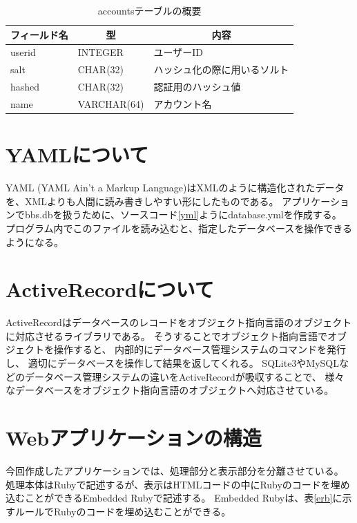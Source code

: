 \documentclass[a4j,titlepage]{jsarticle}
\newcommand{\chuo}[1]{\multicolumn{1}{|c|}{#1}}
\begin{document}
\begin{table}[h]
  \centering
  \caption{accountsテーブルの概要}
  \label{accounts}
  \begin{tabular}{|l|l|l|}
    \hline
    \chuo{フィールド名} & \chuo{型} & \chuo{内容} \\ \hline \hline
    userid & INTEGER    & ユーザーID \\ \hline
    salt & CHAR(32)   & ハッシュ化の際に用いるソルト     \\ \hline
    hashed & CHAR(32) & 認証用のハッシュ値     \\ \hline
    name & VARCHAR(64)      & アカウント名     \\ \hline
  \end{tabular}
\end{table}


\section{YAMLについて}
YAML (YAML Ain't a Markup Language)はXMLのように構造化されたデータを、XMLよりも人間に読み書きしやすい形にしたものである。
アプリケーションでbbs.dbを扱うために、ソースコード\ref{yml}ようにdatabase.ymlを作成する。
プログラム内でこのファイルを読み込むと、指定したデータベースを操作できるようになる。




\section{ActiveRecordについて}
ActiveRecordはデータベースのレコードをオブジェクト指向言語のオブジェクトに対応させるライブラリである。
そうすることでオブジェクト指向言語でオブジェクトを操作すると、
内部的にデータベース管理システムのコマンドを発行し、
適切にデータベースを操作して結果を返してくれる。
SQLite3やMySQLなどのデータベース管理システムの違いをActiveRecordが吸収することで、
様々なデータベースをオブジェクト指向言語のオブジェクトへ対応させている。


\section{Webアプリケーションの構造}
今回作成したアプリケーションでは、処理部分と表示部分を分離させている。
処理本体はRubyで記述するが、表示はHTMLコードの中にRubyのコードを埋め込むことができるEmbedded Rubyで記述する。
Embedded Rubyは、表\ref{erb}に示すルールでRubyのコードを埋め込むことができる。
\end{document}
